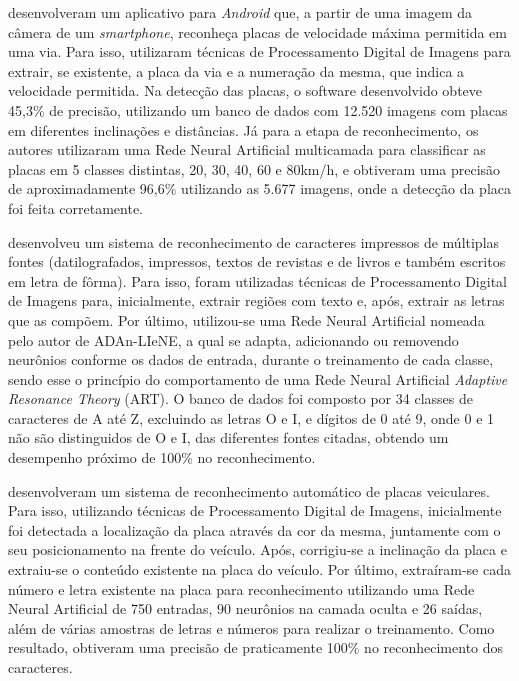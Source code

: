 \documentclass[12pt,oneside,a4paper,chapter=TITLE,section=TITLE,sumario
		=tradicional]{abntex2}
\begin{document}
		 desenvolveram um aplicativo para \textit{Android} que, a partir de uma imagem da câmera de um \textit{smartphone}, reconheça placas de velocidade máxima permitida em uma via. Para isso, utilizaram técnicas de Processamento Digital de Imagens para extrair, se existente, a placa da via e a numeração da mesma, que indica a velocidade permitida. Na detecção das placas, o software desenvolvido obteve 45,3\% de precisão, utilizando um banco de dados com 12.520 imagens com placas em diferentes inclinações e distâncias. Já para a etapa de reconhecimento, os autores utilizaram uma Rede Neural Artificial multicamada para classificar as placas em 5 classes distintas, 20, 30, 40, 60 e 80km/h, e obtiveram uma precisão de aproximadamente 96,6\% utilizando as 5.677 imagens, onde a detecção da placa foi feita corretamente.  
		
		 desenvolveu um sistema de reconhecimento de caracteres impressos de múltiplas fontes (datilografados, impressos, textos de revistas e de livros e também escritos em letra de fôrma). Para isso, foram utilizadas técnicas de Processamento Digital de Imagens para, inicialmente, extrair regiões com texto e, após, extrair as letras que as compõem. Por último, utilizou-se uma Rede Neural Artificial nomeada pelo autor de ADAn-LIeNE, a qual se adapta, adicionando ou removendo neurônios conforme os dados de entrada, durante o treinamento de cada classe, sendo esse o princípio do comportamento de uma Rede Neural Artificial \textit{Adaptive Resonance Theory} (ART). O banco de dados foi composto por 34 classes de caracteres de A até Z, excluindo as letras O e I, e dígitos de 0 até 9, onde 0 e 1 não são distinguidos de O e I, das diferentes fontes citadas, obtendo um desempenho próximo de 100\% no reconhecimento.
		
		 desenvolveram um sistema de reconhecimento automático de placas veiculares. Para isso, utilizando técnicas de Processamento Digital de Imagens, inicialmente foi detectada a localização da placa através da cor da mesma, juntamente com o seu posicionamento na frente do veículo. Após, corrigiu-se a inclinação da placa e extraiu-se o conteúdo existente na placa do veículo. Por último, extraíram-se cada número e letra existente na placa para reconhecimento utilizando uma Rede Neural Artificial de 750 entradas, 90 neurônios na camada oculta e 26 saídas, além de várias amostras de letras e números para realizar o treinamento. Como resultado, obtiveram uma precisão de praticamente 100\% no reconhecimento dos caracteres.
		
\end{document}
